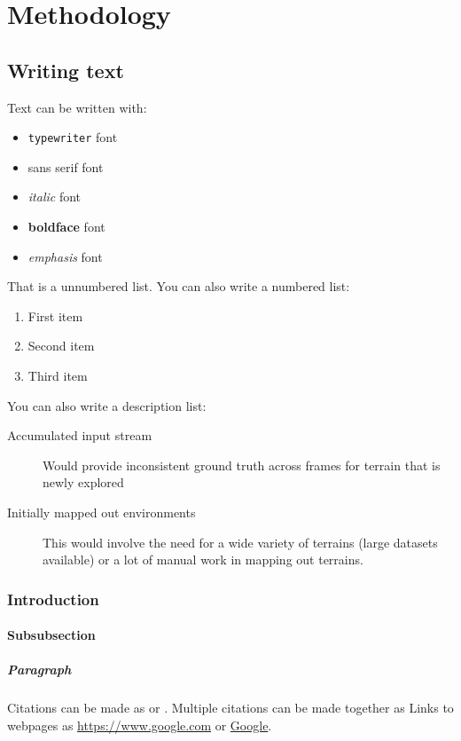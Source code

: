 \chapter{Methodology}
\label{chap:method}

\section{Writing text}
\label{sec:meth/text}

Text can be written with:
\begin{itemize}
    \item \texttt{typewriter} font
    \item \textsf{sans serif} font
    \item \textit{italic} font
    \item \textbf{boldface} font
    \item \emph{emphasis} font
\end{itemize}

That is a unnumbered list. You can also write a numbered list:
\begin{enumerate}
    \item First item
    \item Second item
    \item Third item
\end{enumerate}

You can also write a description list:
\begin{description}
    \item[Accumulated input stream] Would provide inconsistent ground truth across \break frames for terrain that is newly explored
    \item[Initially mapped out environments] This would involve the need for a wide variety of terrains (large datasets available) or a lot of manual work in mapping out terrains.
\end{description}

\subsection{Introduction}
\label{ssec:meth/text/intro}

\subsubsection{Subsubsection}

\paragraph{Paragraph}
Citations can be made as \citep{Heisenberg1983} or \citet{Heisenberg1983}. Multiple citations can be made together as \citep{Heisenberg1983,Einstein1905} Links to webpages as \url{https://www.google.com} or \href{https://www.google.com}{Google}. 

